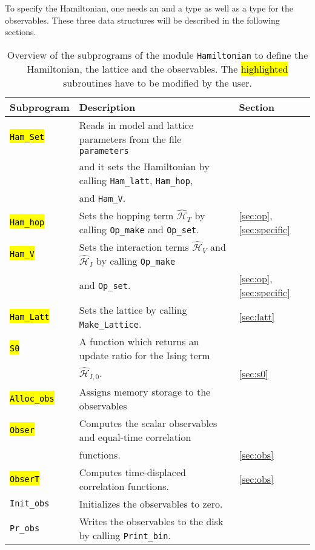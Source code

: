 \documentclass{SciPost}
\DeclareRobustCommand{\hlgray}[1]{{\sethlcolor{dark-gray}\hl{#1}}}
\begin{document}
To specify the Hamiltonian, one needs  an   and a  type as well as a type for the observables. These three data structures will be described in the following sections.

%
\begin{table}[h]
    \begin{tabular}{@{} l l l @{}}\toprule
    Subprogram & Description & Section \\\midrule
    \hlgray{\texttt{Ham\_Set}}  & Reads in model and lattice parameters from the file \texttt{parameters}\\ & and it sets the Hamiltonian by calling \texttt{Ham\_latt}, \texttt{Ham\_hop},\\ & and \texttt{Ham\_V}. & \\
    \hlgray{\texttt{Ham\_hop}}  & Sets the hopping term  $\hat{\mathcal{H}}_{T}$ by calling \texttt{Op\_make} and \texttt{Op\_set}. & \ref{sec:op}, \ref{sec:specific}\\
    \hlgray{\texttt{Ham\_V}}    & Sets the interaction terms  $\hat{\mathcal{H}}_{V}$ and $\hat{\mathcal{H}}_{I}$  by calling \texttt{Op\_make}\\ & and \texttt{Op\_set}.& \ref{sec:op}, \ref{sec:specific}\\  
    \hlgray{\texttt{Ham\_Latt}} & Sets the lattice by calling \texttt{Make\_Lattice}.& \ref{sec:latt}\\
    \hlgray{\texttt{S0}}        & A function which returns an update ratio for the Ising term \\ & $\hat{\mathcal{H}}_{I,0}$. 
    & \ref{sec:s0} \\
    \hlgray{\texttt{Alloc\_obs}} & Assigns memory storage to the observables & \\
    \hlgray{\texttt{Obser}}      & Computes the scalar observables and equal-time correlation\\ & functions. & \ref{sec:obs} \\
    \hlgray{\texttt{ObserT}}     & Computes time-displaced correlation functions. & \ref{sec:obs}\\
    \texttt{Init\_obs}  & Initializes the observables to zero. & \\    
    \texttt{Pr\_obs}    & Writes the observables to the disk by calling \texttt{Print\_bin}. \\\bottomrule    
   \end{tabular}
   \caption{Overview of the subprograms of the  module \texttt{Hamiltonian} to define the Hamiltonian, the lattice and the observables. 
   The \hlgray{highlighted} subroutines have to be modified by the user.
    \label{table:hamiltonian}}
\end{table}
%
\end{document}
